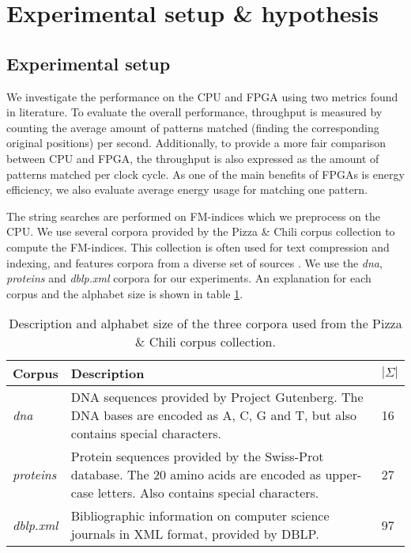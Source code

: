 \section{Experimental setup \& hypothesis} \label{section:experiment_setup_hypo}

\subsection{Experimental setup} \label{section:experiment_setup}

We investigate the performance on the CPU and FPGA using two metrics found in literature.
To evaluate the overall performance, throughput is measured by counting the average amount of patterns matched (finding the corresponding original positions) per second.
Additionally, to provide a more fair comparison between CPU and FPGA, the throughput is also expressed as the amount of patterns matched per clock cycle.
As one of the main benefits of FPGAs is energy efficiency, we also evaluate average energy usage for matching one pattern.

The string searches are performed on FM-indices which we preprocess on the CPU.
We use several corpora provided by the Pizza \& Chili corpus collection \cite{ferragina_pizzachili_nodate} to compute the FM-indices.
This collection is often used for text compression and indexing, and features corpora from a diverse set of sources \cite{makinen_compressed_2007}.
We use the \textit{dna}, \textit{proteins} and \textit{dblp.xml} corpora for our experiments.
An explanation for each corpus and the alphabet size is shown in table \ref{table:corpora}.

\begin{table}[H]
  \begin{tabularx}{\linewidth}{l X l}
    \hline
    \textbf{Corpus} & \textbf{Description} & \textbf{$|\Sigma|$} \\ \hline
    \textit{dna} & DNA sequences provided by Project Gutenberg. The DNA bases are encoded as A, C, G and T, but also contains special characters. & 16 \\ \hline
    \textit{proteins} & Protein sequences provided by the Swiss-Prot database. The 20 amino acids are encoded as upper-case letters. Also contains special characters. & 27 \\ \hline
    \textit{dblp.xml} & Bibliographic information on computer science journals in XML format, provided by DBLP. & 97 \\ \hline
  \end{tabularx}
  \caption{Description and alphabet size of the three corpora used from the Pizza \& Chili corpus collection.}
  \label{table:corpora}
\end{table}

